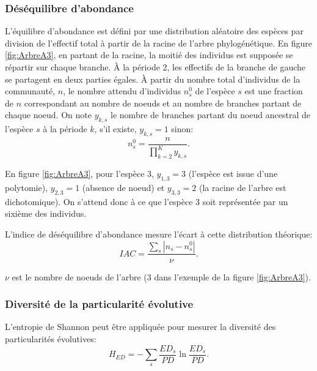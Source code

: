 \documentclass[
  11pt,
  french,
  a4paper,
  extrafontsizes,onecolumn,openright
  ]{memoir}
\begin{document}
\hypertarget{duxe9suxe9quilibre-dabondance}{%
\subsubsection{Déséquilibre d'abondance}\label{duxe9suxe9quilibre-dabondance}}

L'équilibre d'abondance est défini par une distribution aléatoire des espèces par division de l'effectif total à partir de la racine de l'arbre phylogénétique.
En figure \ref{fig:ArbreA3}, en partant de la racine, la moitié des individus est supposée se répartir sur chaque branche.
À la période 2, les effectifs de la branche de gauche se partagent en deux parties égales.
À partir du nombre total d'individus de la communauté, \(n\), le nombre attendu d'individus \(n_s^0\) de l'espèce \(s\) est une fraction de \(n\) correspondant au nombre de noeuds et au nombre de branches partant de chaque noeud.
On note \(y_{k,s}\) le nombre de branches partant du noeud ancestral de l'espèce \(s\) à la période \(k\), s'il existe, \(y_{k,s}=1\) sinon:
\begin{equation}
  n_s^0 = \frac{n}{\prod_{k=2}^{K}{y_{k,s}}}.
\end{equation}

En figure \ref{fig:ArbreA3}, pour l'espèce 3, \(y_{1,3}=3\) (l'espèce est issue d'une polytomie), \(y_{2,3}=1\) (absence de noeud) et \(y_{3,3}=2\) (la racine de l'arbre est dichotomique).
On s'attend donc à ce que l'espèce 3 soit représentée par un sixième des individus.

L'indice de déséquilibre d'abondance mesure l'écart à cette distribution théorique:
\begin{equation}
  \label{eq:IAC}
  \mathit{IAC} = \frac{\sum_s{|n_s - n_s^0|}}{\nu}.
\end{equation}

\(\nu\) est le nombre de noeuds de l'arbre (3 dans l'exemple de la figure \ref{fig:ArbreA3}).

\hypertarget{diversituxe9-de-la-particularituxe9-uxe9volutive}{%
\subsubsection{Diversité de la particularité évolutive}\label{diversituxe9-de-la-particularituxe9-uxe9volutive}}

L'entropie de Shannon peut être appliquée pour mesurer la diversité des particularités évolutives:
\begin{equation}
  \label{eq:HED}
  H_{\mathit{ED}} = -\sum_s{\frac{\mathit{ED}_s}{\mathit{PD}} \ln\frac{\mathit{ED}_s}{\mathit{PD}}}.
\end{equation}
\end{document}
